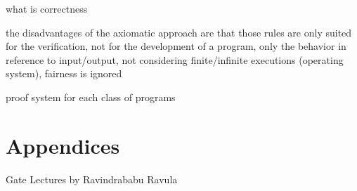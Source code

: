 what is correctness

the disadvantages of the axiomatic approach are that those rules are
only suited for the verification, not for the development of a program,
only the behavior in reference to input/output, not considering finite/infinite
executions (operating system), fairness is ignored

proof system for each class of programs

\textemdash{}

\textemdash{}

\newpage{}

\chapter*{Appendices}

Gate Lectures by Ravindrababu Ravula

\clearpage
{}

%

\clearpage
{}


\nocite{*}


\begin{flushleft}
\newpage{}
\par\end{flushleft}

%

